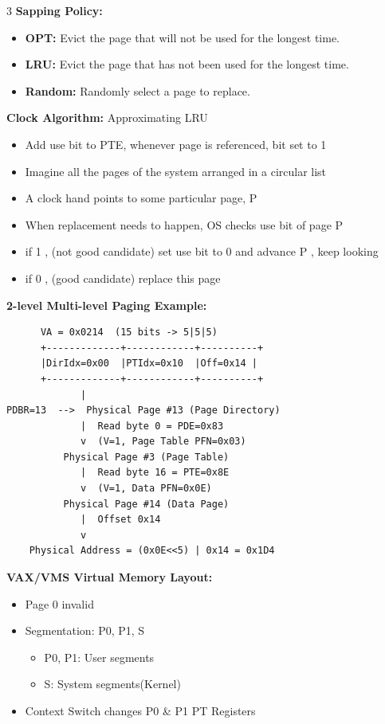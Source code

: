 \documentclass[8pt]{innovativeinnovation-cheatsheet}
\begin{document}
\begin{multicols*}{3}
\textbf{Sapping Policy:}
\begin{itemize}
      \item \textbf{OPT:} Evict the page that will not be used for the longest time.
      \item \textbf{LRU:} Evict the page that has not been used for the longest time.
      \item \textbf{Random:} Randomly select a page to replace.
\end{itemize}

\textbf{Clock Algorithm:} Approximating LRU
\begin{itemize}
      \item Add use bit to PTE, whenever page is referenced, bit set to 1
      \item Imagine all the pages of the system arranged in a circular list
      \item A clock hand points to some particular page, P
      \item When replacement needs to happen, OS checks use bit of page P
      \item if 1 , (not good candidate) set use bit to 0 and advance P , keep looking
      \item if 0 , (good candidate) replace this page
\end{itemize}

\textbf{2-level Multi-level Paging Example:}
\begin{lstlisting}
      VA = 0x0214  (15 bits -> 5|5|5)
      +-------------+------------+----------+
      |DirIdx=0x00  |PTIdx=0x10  |Off=0x14 |
      +-------------+------------+----------+
             |
PDBR=13  -->  Physical Page #13 (Page Directory)
             |  Read byte 0 = PDE=0x83 
             v  (V=1, Page Table PFN=0x03)
          Physical Page #3 (Page Table)
             |  Read byte 16 = PTE=0x8E 
             v  (V=1, Data PFN=0x0E)
          Physical Page #14 (Data Page)
             |  Offset 0x14
             v
    Physical Address = (0x0E<<5) | 0x14 = 0x1D4
\end{lstlisting}

\textbf{VAX/VMS Virtual Memory Layout:}
\begin{itemize}
      \item Page 0 invalid
      \item Segmentation: P0, P1, S
      \begin{itemize}
            \item P0, P1: User segments
            \item S: System segments(Kernel)
      \end{itemize}
      \item Context Switch changes P0 \& P1 PT Registers
\end{itemize}


\end{multicols*}
\end{document}
